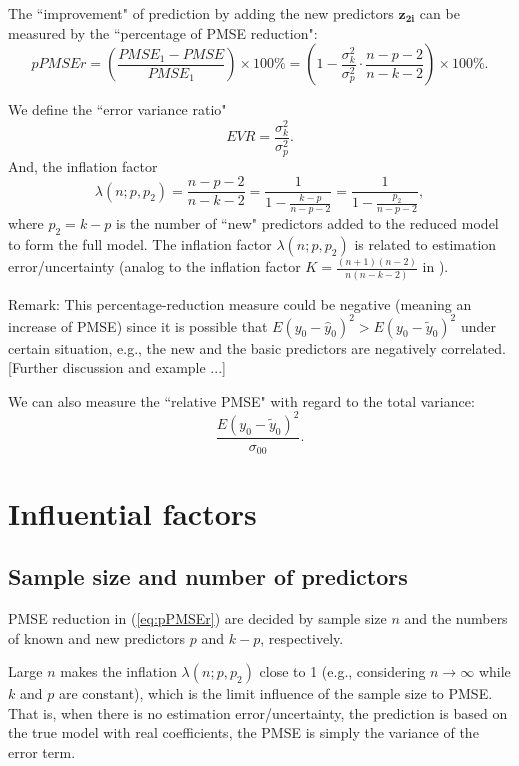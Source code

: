 \documentclass[11pt]{article}
\begin{document}
The ``improvement" of prediction by adding the new predictors $\boldsymbol{z_{2i}}$ can be measured by the ``percentage of PMSE reduction": 
\begin{equation}
\label{eq:pPMSEr}
pPMSEr = \left(\frac{PMSE_1 - PMSE}{PMSE_1} \right)\times 100\%
= \left(1 - \frac{\sigma_k^2}{\sigma_p^2} \cdot \frac{n-p-2}{n-k-2}\right)\times 100\%.
\end{equation}

We define the ``error variance ratio" 
$$
EVR = \frac{\sigma_k^2}{\sigma_p^2}. 
$$
And, the inflation factor 
$$
\lambda(n; p, p_2) = \frac{n-p-2}{n-k-2} =  \frac{1}{1 - \frac{k-p}{n-p-2}} = \frac{1}{1 - \frac{p_2}{n-p-2}}, 
$$
where $p_2 = k-p$ is the number of ``new" predictors added to the reduced model to form the full model. 
The inflation factor $\lambda(n; p, p_2)$ is related to estimation error/uncertainty (analog to the inflation factor $K = \frac{(n+1)(n-2)}{n(n-k-2)}$ in \cite{sawyer1982sample}). 

Remark: This percentage-reduction measure could be negative (meaning an increase of PMSE) since it is possible that $E(y_0 - \hat{y}_0)^2 > E(y_0 - \tilde{y}_0)^2$ under certain situation, e.g., the new and the basic predictors are negatively correlated. [Further discussion and example ...]

We can also measure the ``relative PMSE" with regard to the total variance: 
$$
\frac{E(y_0 - \tilde{y}_0)^2}{\sigma_{00}}. 
$$


\section{Influential factors}

\subsection{Sample size and number of predictors}

PMSE reduction in (\ref{eq:pPMSEr}) are decided by sample size $n$ and the numbers of known and new predictors $p$ and $k-p$, respectively. 


Large $n$ makes the inflation $\lambda(n; p, p_2)$ close to 1 (e.g., considering $n\to\infty$ while $k$ and $p$ are constant), which is the limit influence of the sample size to PMSE. That is, when there is no estimation error/uncertainty, the prediction is based on the true model with real coefficients, the PMSE is simply the variance of the error term. 
\end{document}
